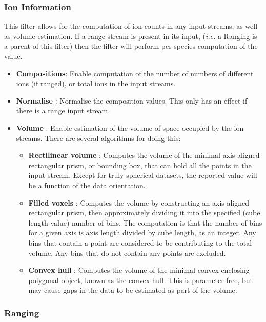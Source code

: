 \documentclass[10pt]{article}
\begin{document}
\subsubsection{Ion Information}

This filter allows for the computation of ion counts in any input streams, as well as volume estimation. If a range stream is present in its input, (\emph{i.e.} a Ranging is a parent of this filter) then the filter will perform per-species computation of the value.

\begin{itemize}
 \item \textbf{Compositions}: Enable computation of the number of numbers of different ions (if ranged), or total ions in the input streams.
 \item \textbf{Normalise} : Normalise the composition values. This only has an effect if there is a range input stream.
 \item \textbf{Volume} : Enable estimation of the volume of space occupied by the ion streams. There are several algorithms for doing this:
    \begin{itemize}
	\item \textbf{Rectilinear volume} : Computes the volume of the minimal axis aligned rectangular prism, or bounding box, that can hold all the points in the input stream. Except for truly spherical datasets, the reported value will be a function of the data orientation.
	\item \textbf{Filled voxels} : Computes the volume by constructing an axis aligned rectangular prism, then approximately dividing it into the  specified (cube length value) number of bins. The computation is that the number of bins for a given axis is axis length divided by cube length, as an integer. Any bins that contain a point are considered to be contributing to the total volume. Any bins that do not contain any points are excluded.
	\item \textbf{Convex hull} : Computes the volume of the minimal convex enclosing polygonal object, known as the convex hull. This is parameter free, but may cause gaps in the data to be estimated as part of the volume.
    \end{itemize}
    
\end{itemize}



\subsubsection{Ranging}
\end{document}
